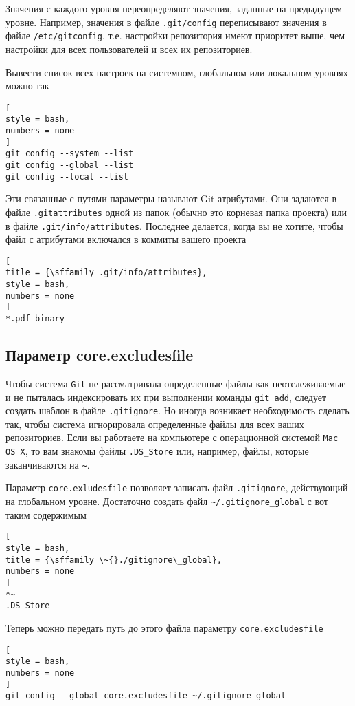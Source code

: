 \documentclass[%
	11pt,
	a4paper,
	utf8,
		]{article}
\begin{document}
Значения с каждого уровня переопределяют значения, заданные на предыдущем уровне. Например, значения в файле \verb|.git/config| переписывают значения в файле \verb|/etc/gitconfig|, т.е. настройки репозитория имеют приоритет выше, чем настройки для всех пользователей и всех их репозиториев.

Вывести список всех настроек на системном, глобальном или локальном уровнях можно так
\begin{lstlisting}[
style = bash,
numbers = none
]
git config --system --list
git config --global --list
git config --local --list
\end{lstlisting}

Эти связанные с путями параметры называют Git-атрибутами. Они задаются в файле \texttt{.gitattributes} одной из папок (обычно это корневая папка проекта) или в файле \texttt{.git/info/attributes}. Последнее делается, когда вы не хотите, чтобы файл с атрибутами включался в коммиты вашего проекта
\begin{lstlisting}[
title = {\sffamily .git/info/attributes},
style = bash,
numbers = none	
]
*.pdf binary
\end{lstlisting}

\subsection{Параметр core.excludesfile}

Чтобы система \texttt{Git} не рассматривала определенные файлы как неотслеживаемые и не пыталась индексировать их при выполнении команды \texttt{git add}, следует создать шаблон в файле \texttt{.gitignore}. Но иногда возникает необходимость сделать так, чтобы система игнорировала определенные файлы для всех ваших репозиториев. Если вы работаете на компьютере с операционной системой \texttt{Mac OS X}, то вам знакомы файлы \texttt{.DS\_Store} или, например, файлы, которые заканчиваются на \verb|~|.

Параметр \texttt{core.exludesfile} позволяет записать файл \texttt{.gitignore}, действующий на глобальном уровне. Достаточно создать файл \verb|~/.gitignore_global| с вот таким содержимым
\begin{lstlisting}[
style = bash,
title = {\sffamily \~{}./gitignore\_global},
numbers = none
]
*~
.DS_Store
\end{lstlisting}

Теперь можно передать путь до этого файла параметру \texttt{core.excludesfile}
\begin{lstlisting}[
style = bash,
numbers = none
]
git config --global core.excludesfile ~/.gitignore_global
\end{lstlisting}
\end{document}
